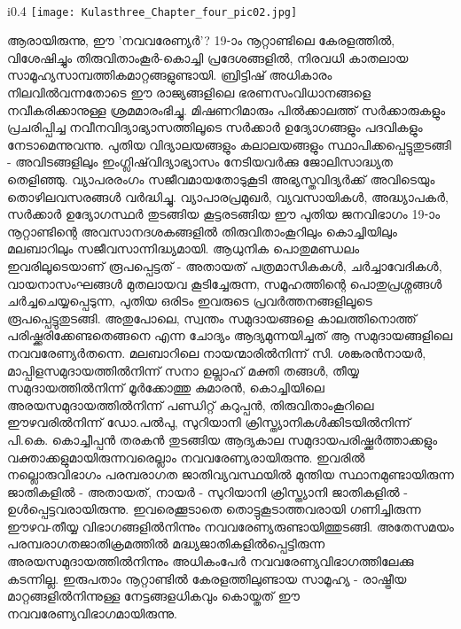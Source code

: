 \paragraph{}
\begin{wrapfigure}{i}{0.4\textwidth}
\texttt{[image: Kulasthree\_Chapter\_four\_pic02.jpg]}
\end{wrapfigure}ആരായിരുന്നു, ഈ 'നവവരേണ്യർ'? 19-ാം നൂറ്റാണ്ടിലെ കേരളത്തിൽ, വിശേഷിച്ചും തിരുവിതാംകൂർ-കൊച്ചി പ്രദേശങ്ങളിൽ, നിരവധി കാതലായ സാമൂഹ്യസാമ്പത്തികമാറ്റങ്ങളുണ്ടായി. ബ്രിട്ടിഷ് അധികാരം നിലവിൽവന്നതോടെ ഈ രാജ്യങ്ങളിലെ ഭരണസംവിധാനങ്ങളെ നവീകരിക്കാനുള്ള ശ്രമമാരംഭിച്ചു. മിഷണറിമാരും പിൽക്കാലത്ത് സർക്കാരുകളും പ്രചരിപ്പിച്ച നവീനവിദ്യാഭ്യാസത്തിലൂടെ സർക്കാർ ഉദ്യോഗങ്ങളും പദവികളും നേടാമെന്നുവന്നു. പുതിയ വിദ്യാലയങ്ങളും കലാലയങ്ങളും സ്ഥാപിക്കപ്പെട്ടുതുടങ്ങി - അവിടങ്ങളിലും ഇംഗ്ലിഷ്‌വിദ്യാഭ്യാസം നേടിയവർക്കു ജോലിസാദ്ധ്യത തെളിഞ്ഞു. വ്യാപരരംഗം സജീവമായതോടുകൂടി അഭ്യസ്തവിദ്യർക്ക് അവിടെയും തൊഴിലവസരങ്ങൾ വർദ്ധിച്ചു. വ്യാപാരപ്രമുഖർ, വ്യവസായികൾ, അദ്ധ്യാപകർ, സർക്കാർ ഉദ്യോഗസ്ഥർ തുടങ്ങിയ കൂട്ടരടങ്ങിയ ഈ പുതിയ ജനവിഭാഗം 19-ാം നൂറ്റാണ്ടിന്റെ അവസാനദശകങ്ങളിൽ തിരുവിതാംകൂറിലും കൊച്ചിയിലും മലബാറിലും സജീവസാന്നിദ്ധ്യമായി. ആധുനിക പൊതുമണ്ഡലം ഇവരിലൂടെയാണ് രൂപപ്പെട്ടത് - അതായത് പത്രമാസികകൾ, ചർച്ചാവേദികൾ, വായനാസംഘങ്ങൾ മുതലായവ കൂടിച്ചേരുന്ന, സമൂഹത്തിന്റെ പൊതുപ്രശ്നങ്ങൾ ചർച്ചചെയ്യപ്പെടുന്ന, പുതിയ ഒരിടം ഇവരുടെ പ്രവർത്തനങ്ങളിലൂടെ രൂപപ്പെട്ടുതുടങ്ങി. അതുപോലെ, സ്വന്തം സമുദായങ്ങളെ കാലത്തിനൊത്ത് പരിഷ്ക്കരിക്കേണ്ടതെങ്ങനെ എന്ന ചോദ്യം ആദ്യമുന്നയിച്ചത് ആ സമുദായങ്ങളിലെ നവവരേണ്യർതന്നെ. മലബാറിലെ നായന്മാരിൽനിന്ന് സി. ശങ്കരൻനായർ, മാപ്പിളസമുദായത്തിൽനിന്ന് സനാ ഉല്ലാഹ് മക്തി തങ്ങൾ, തീയ്യ സമുദായത്തിൽനിന്ന് മൂർക്കോത്തു കുമാരൻ, കൊച്ചിയിലെ അരയസമുദായത്തിൽനിന്ന് പണ്ഡിറ്റ് കറുപ്പൻ, തിരുവിതാംകൂറിലെ ഈഴവരിൽനിന്ന് ഡോ.പൽപു, സുറിയാനി ക്രിസ്ത്യാനികൾക്കിടയിൽനിന്ന് പി.കെ. കൊച്ചീപ്പൻ തരകൻ തുടങ്ങിയ ആദ്യകാല സമുദായപരിഷ്ക്കർത്താക്കളും വക്താക്കളുമായിരുന്നവരെല്ലാം നവവരേണ്യരായിരുന്നു. ഇവരിൽ നല്ലൊരുവിഭാഗം പരമ്പരാഗത ജാതിവ്യവസ്ഥയിൽ മുന്തിയ സ്ഥാനമുണ്ടായിരുന്ന ജാതികളിൽ - അതായത്, നായർ - സുറിയാനി ക്രിസ്ത്യാനി ജാതികളിൽ - ഉൾപ്പെട്ടവരായിരുന്നു. ഇവരെക്കൂടാതെ തൊട്ടുകൂടാത്തവരായി ഗണിച്ചിരുന്ന ഈഴവ-തീയ്യ വിഭാഗങ്ങളിൽനിന്നും നവവരേണ്യരുണ്ടായിത്തുടങ്ങി. അതേസമയം പരമ്പരാഗതജാതിക്രമത്തിൽ മദ്ധ്യജാതികളിൽപ്പെട്ടിരുന്ന അരയസമുദായത്തിൽനിന്നും അധികംപേർ നവവരേണ്യവിഭാഗത്തിലേക്കു കടന്നില്ല. ഇരുപതാം നൂറ്റാണ്ടിൽ കേരളത്തിലുണ്ടായ സാമൂഹ്യ - രാഷ്ട്രീയ മാറ്റങ്ങളിൽനിന്നുള്ള നേട്ടങ്ങളധികവും കൊയ്തത് ഈ നവവരേണ്യവിഭാഗമായിരുന്നു.


